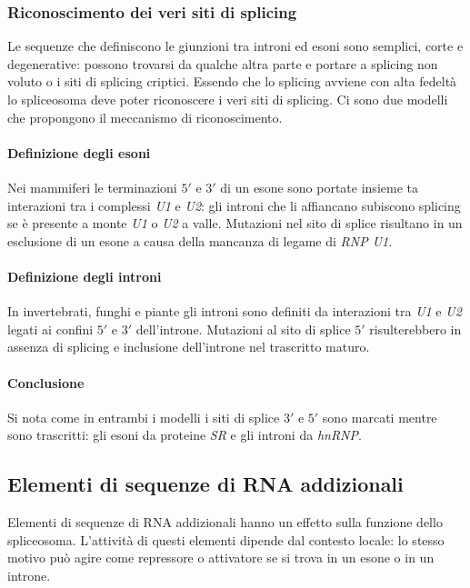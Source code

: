 \subsubsection{Riconoscimento dei veri siti di splicing}
Le sequenze che definiscono le giunzioni tra introni ed esoni sono semplici, corte e degenerative: possono trovarsi da qualche altra parte e portare a splicing non voluto o i siti di 
splicing criptici. Essendo che lo splicing avviene con alta fedelt\`a lo spliceosoma deve poter riconoscere i veri siti di splicing. Ci sono due modelli che propongono il meccanismo di 
riconoscimento. 
\paragraph{Definizione degli esoni}
Nei mammiferi le terminazioni $5'$ e $3'$ di un esone sono portate insieme ta interazioni tra i complessi \emph{U1} e \emph{U2}: gli introni che li affiancano subiscono splicing se 
\`e presente a monte \emph{U1} o \emph{U2} a valle. Mutazioni nel sito di splice risultano in un esclusione di un esone a causa della mancanza di legame di \emph{RNP U1}. 
\paragraph{Definizione degli introni}
In invertebrati, funghi e piante gli introni sono definiti da interazioni tra \emph{U1} e \emph{U2} legati ai confini $5'$ e $3'$ dell'introne. Mutazioni al sito di splice $5'$ 
risulterebbero in assenza di splicing e inclusione dell'introne nel trascritto maturo. 
\paragraph{Conclusione}
Si nota come in entrambi i modelli i siti di splice $3'$ e $5'$ sono marcati mentre sono trascritti: gli esoni da proteine \emph{SR} e gli introni da \emph{hnRNP}. 
\subsection{Elementi di sequenze di RNA addizionali}
Elementi di sequenze di RNA addizionali hanno un effetto sulla funzione dello spliceosoma. L'attivit\`a di questi elementi dipende dal contesto locale: lo stesso motivo pu\`o agire 
come repressore o attivatore se si trova in un esone o in un introne. 
